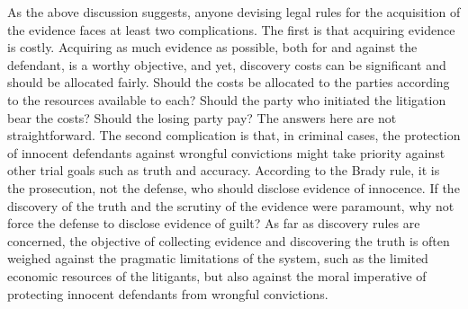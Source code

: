 \documentclass[10pt]{article}
\begin{document}

As the above discussion suggests, anyone devising legal rules for the acquisition of the evidence faces
at least two complications.  The first is that acquiring evidence is costly. Acquiring as much evidence as possible, both for and against the defendant, is a worthy objective, and yet,  discovery costs can be significant and should be allocated fairly. Should the costs be allocated to the parties according to the resources available to each? Should the party who initiated the litigation bear the costs? Should the losing party pay? The answers here are not straightforward.  The second complication is that, in criminal cases, the protection of innocent defendants against wrongful convictions might take priority against other trial goals such as truth and accuracy. According to the Brady rule, it is the prosecution, not the defense, who should disclose evidence of innocence. If the discovery of the truth and the scrutiny of the evidence were paramount, why not force the defense to disclose evidence of guilt? As far as discovery rules are concerned, the objective of collecting evidence and discovering the truth is often weighed against the pragmatic limitations of the system, such as the limited economic resources of the litigants, but also against the moral imperative of protecting innocent defendants from wrongful convictions.



\end{document}
